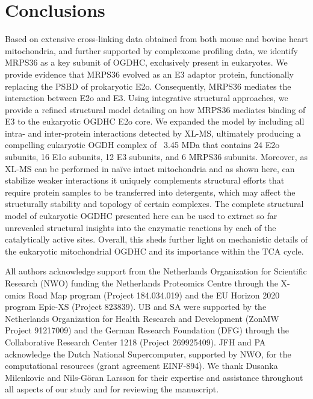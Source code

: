 \documentclass[times, twoside]{zHenriquesLab-StyleBioRxiv}
\begin{document}
\section*{Conclusions}
Based on extensive cross-linking data obtained from both mouse and bovine heart mitochondria, and further supported by complexome profiling data, we identify MRPS36 as a key subunit of OGDHC, exclusively present in eukaryotes. We provide evidence that MRPS36 evolved as an E3 adaptor protein, functionally replacing the PSBD of prokaryotic E2o. Consequently, MRPS36 mediates the interaction between E2o and E3. Using integrative structural approaches, we provide a refined structural model detailing on how MRPS36 mediates binding of E3 to the eukaryotic OGDHC E2o core. We expanded the model by including all intra- and inter-protein interactions detected by XL-MS, ultimately producing a compelling eukaryotic OGDH complex of ~3.45 MDa that contains 24 E2o subunits, 16 E1o subunits, 12 E3 subunits, and 6 MRPS36 subunits. Moreover, as XL-MS can be performed in naïve intact mitochondria and as shown here, can stabilize weaker interactions it uniquely complements structural efforts that require protein samples to be transferred into detergents, which may affect the structurally stability and topology of certain complexes. The complete structural model of eukaryotic OGDHC presented here can be used to extract so far unrevealed structural insights into the enzymatic reactions by each of the catalytically active sites. Overall, this sheds further light on mechanistic details of the eukaryotic mitochondrial OGDHC and its importance within the TCA cycle.

\begin{acknowledgements}
All authors acknowledge support from the Netherlands Organization for Scientific Research (NWO) funding the Netherlands Proteomics Centre through the X-omics Road Map program (Project 184.034.019) and the EU Horizon 2020 program Epic-XS (Project 823839). UB and SA were supported by the Netherlands Organization for Health Research and Development (ZonMW Project 91217009) and the German Research Foundation (DFG) through the Collaborative Research Center 1218 (Project 269925409). JFH and PA acknowledge the Dutch National Supercomputer, supported by NWO, for the computational resources (grant agreement EINF-894). We thank Dusanka Milenkovic and Nils-Göran Larsson for their expertise and assistance throughout all aspects of our study and for reviewing the manuscript.
\end{acknowledgements}
\end{document}
